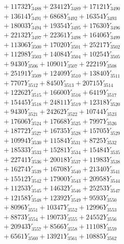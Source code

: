 \documentclass[a4paper,10pt]{article}
\begin{document}
{\begin{align}
&\;  + 11732 Y_{3488} + 23412 Y_{3489} + 17121 Y_{3490} \\[0.3ex]
&\;  + 13614 Y_{3491} + 6868 Y_{3492} + 16354 Y_{3493} \\[0.3ex]
&\;  + 18003 Y_{3494} + 19354 Y_{3495} + 17630 Y_{3496} \\[0.3ex]
&\;  + 22132 Y_{3497} + 22361 Y_{3498} + 16406 Y_{3499} \\[0.3ex]
&\;  + 11306 Y_{3500} + 17020 Y_{3501} + 25217 Y_{3502} \\[0.3ex]
&\;  + 11298 Y_{3503} + 14084 Y_{3504} + 10254 Y_{3505} \\[0.3ex]
&\;  + 9430 Y_{3506} + 10901 Y_{3507} + 22219 Y_{3508} \\[0.5ex]\allowbreak
&\;  + 25191 Y_{3509} + 12409 Y_{3510} + 13840 Y_{3511} \\[0.3ex]
&\;  + 7707 Y_{3512} + 8450 Y_{3513} + 20715 Y_{3514} \\[0.3ex]
&\;  + 12262 Y_{3515} + 16600 Y_{3516} + 6419 Y_{3517} \\[0.3ex]
&\;  + 15445 Y_{3518} + 24811 Y_{3519} + 12318 Y_{3520} \\[0.3ex]
&\;  + 9430 Y_{3521} + 24262 Y_{3522} + 10744 Y_{3523} \\[0.3ex]
&\;  + 17606 Y_{3524} + 17668 Y_{3525} + 7997 Y_{3526} \\[0.3ex]
&\;  + 18772 Y_{3527} + 16735 Y_{3528} + 15705 Y_{3529} \\[0.3ex]
&\;  + 10994 Y_{3530} + 11584 Y_{3531} + 8725 Y_{3532} \\[0.3ex]
&\;  + 18533 Y_{3533} + 15281 Y_{3534} + 15484 Y_{3535} \\[0.3ex]
&\;  + 22741 Y_{3536} + 20018 Y_{3537} + 11983 Y_{3538} \\[0.5ex]\allowbreak
&\;  + 16274 Y_{3539} + 16708 Y_{3540} + 21340 Y_{3541} \\[0.3ex]
&\;  + 15512 Y_{3542} + 17900 Y_{3543} + 20958 Y_{3544} \\[0.3ex]
&\;  + 11253 Y_{3545} + 14632 Y_{3546} + 25253 Y_{3547} \\[0.3ex]
&\;  + 12158 Y_{3548} + 12392 Y_{3549} + 9593 Y_{3550} \\[0.3ex]
&\;  + 8096 Y_{3551} + 10347 Y_{3552} + 12996 Y_{3553} \\[0.3ex]
&\;  + 8873 Y_{3554} + 19073 Y_{3555} + 24552 Y_{3556} \\[0.3ex]
&\;  + 20943 Y_{3557} + 8566 Y_{3558} + 11108 Y_{3559} \\[0.3ex]
&\;  + 6561 Y_{3560} + 13921 Y_{3561} + 10885 Y_{3562} \\[0.3ex]

\end{align}}
\end{document}

